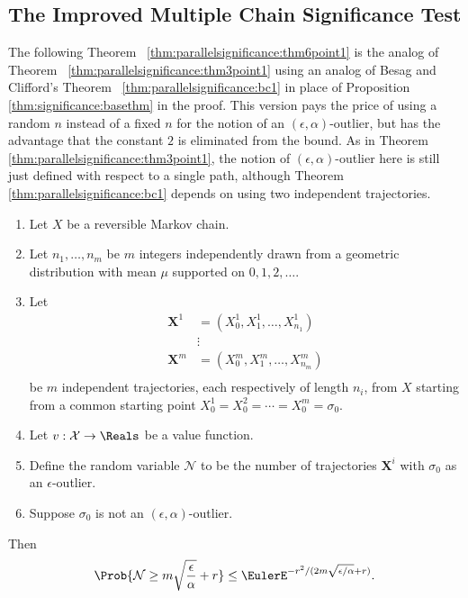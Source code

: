 \documentclass[12pt]{article}
\begin{document}
\subsection*{The Improved Multiple Chain Significance Test}

The following Theorem~%
\ref{thm:parallelsignificance:thm6point1} is the analog of Theorem~%
\ref{thm:parallelsignificance:thm3point1} using an analog of Besag and
Clifford's Theorem~%
\ref{thm:parallelsignificance:bc1} in place of Proposition~%
\ref{thm:significance:basethm} in the proof.  This version pays the
price of using a random \( n \) instead of a fixed \( n \) for the
notion of an \( (\epsilon, \alpha) \)-outlier, but has the advantage
that the constant \( 2 \) is eliminated from the bound.  As in Theorem~%
\ref{thm:parallelsignificance:thm3point1}, the notion of \( (\epsilon,
\alpha) \)-outlier here is still just defined with respect to a single
path, although Theorem~%
\ref{thm:parallelsignificance:bc1} depends on using two independent
trajectories.

\begin{theorem}
    \label{thm:parallelsignificance:thm6point1}
    \begin{enumerate}
        \item
            Let \( X \) be a reversible Markov chain.
        \item
            Let \( n_1, \dots, n_m \) be \( m \) integers independently
            drawn from a geometric distribution with mean \( \mu \)
            supported on \( 0,1,2,\dots \).
        \item
            Let
            \begin{align*}
                \mathbf{X}^1    &= (X_0^1, X_1^1, \dots, X_{n_1}^1 )\\
                &\vdots \\
                \mathbf{X}^m    &= (X_0^m, X_1^m, \dots, X_{n_m}^m )\\
            \end{align*}
            be \( m \) independent trajectories, each respectively of
            length \( n_{i} \), from \( X \) starting from a common
            starting point \( X_0^1 = X_0^2 = \cdots = X_0^m = \sigma_0 \).
        \item
            Let \( v :  \mathcal{X} \to \Reals \) be a value function.
        \item
            Define the random variable \( \mathcal{N} \) to be the
            number of trajectories \( \mathbf{X}^i \) with \( \sigma_0 \)
            as an \( \epsilon \)-outlier.
        \item
            Suppose \( \sigma_0 \) is not an \( (\epsilon, \alpha) \)-outlier.
    \end{enumerate}
    Then
    \[
        \Prob{\mathcal{N} \ge m \sqrt{ \frac{\epsilon}{\alpha}} + r} \le
        \EulerE^{-r^2/( 2 m \sqrt{\epsilon/\alpha} + r)}.
    \]
\end{theorem}
\end{document}
